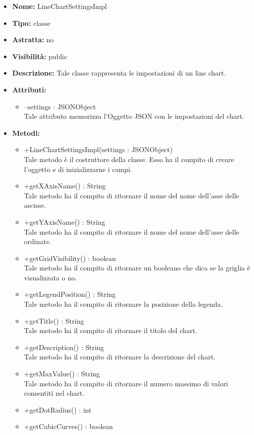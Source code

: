 			
			\begin{itemize}
			\item \textbf{Nome:} LineChartSettingsImpl
			\item \textbf{Tipo:} classe
			
		\item \textbf{Astratta:}
		no
			\item \textbf{Visibilità:} public
			\item \textbf{Descrizione:} Tale classe rappresenta le impostazioni di un line chart.
			\item \textbf{Attributi:}
				\begin{itemize}
				\setlength{\itemsep}{5pt}
				
					\item[\ding{111}] {--settings : JSONObject} \\ [1mm] Tale attributo memorizza l'Oggetto JSON con le impostazioni del chart.
				\end{itemize}
		
			\item \textbf{Metodi:}
				\begin{itemize}
				\setlength{\itemsep}{5pt}
				
					\item[\ding{111}] {{+LineChartSettingsImpl(settings : JSONObject)}} \\ [1mm] Tale metodo è il costruttore della classe. Esso ha il compito di creare l'oggetto e di inizializzarne i campi.
					\item[\ding{111}] {{+getXAxisName() : String}} \\ [1mm] Tale metodo ha il compito di ritornare il nome del nome dell'asse delle ascisse.
					\item[\ding{111}] {{+getYAxisName() : String}} \\ [1mm] Tale metodo ha il compito di ritornare il nome del nome dell'asse delle ordinate.
					\item[\ding{111}] {{+getGridVisibility() : boolean}} \\ [1mm] Tale metodo ha il compito di ritornare un booleano che dica se la griglia è visualizzata o no.
					\item[\ding{111}] {{+getLegendPosition() : String}} \\ [1mm] Tale metodo ha il compito di ritornare la posizione della legenda.
					\item[\ding{111}] {{+getTitle() : String}} \\ [1mm] Tale metodo ha il compito di ritornare il titolo del chart.
					\item[\ding{111}] {{+getDescription() : String}} \\ [1mm] Tale metodo ha il compito di ritornare la descrizione del chart.
					\item[\ding{111}] {{+getMaxValue() : String}} \\ [1mm] Tale metodo ha il compito di ritornare il numero massimo di valori consentiti nel chart.
					\item[\ding{111}] {{+getDotRadius() : int}}
					\item[\ding{111}] {{+getCubicCurves() : boolean}}
				\end{itemize}
		

\end{itemize}
